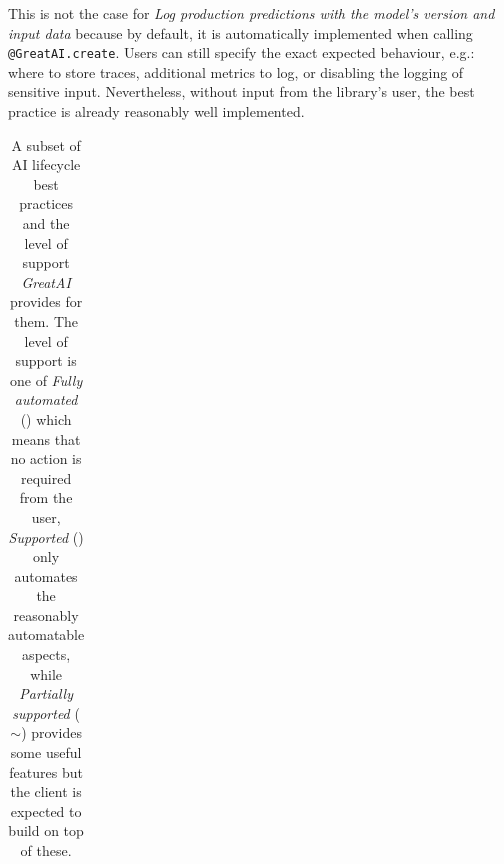 This is not the case for \textit{Log production predictions with the model's version and input data} because by default, it is automatically implemented when calling \texttt{@GreatAI.create}. Users can still specify the exact expected behaviour, e.g.: where to store traces, additional metrics to log, or disabling the logging of sensitive input. Nevertheless, without input from the library's user, the best practice is already reasonably well implemented.

\begin{table}
\centering
\begin{threeparttable}
\caption{A subset of AI lifecycle best practices and the level of support \textit{GreatAI} provides for them. The level of support is one of \textit{Fully automated} (\checkmark\checkmark) which means that no action is required from the user, \textit{Supported} (\checkmark) only automates the reasonably automatable aspects, while \textit{Partially supported} ($\sim$) provides some useful features but the client is expected to build on top of these.}

\label{table:best-practices-1}
{\renewcommand{\arraystretch}{1.2} %
\begin{tabular}{p{7cm}@{\hskip 0.5cm}l@{\hskip 0cm}c} \hline


\end{tabular}}
\end{threeparttable}
\end{table}
